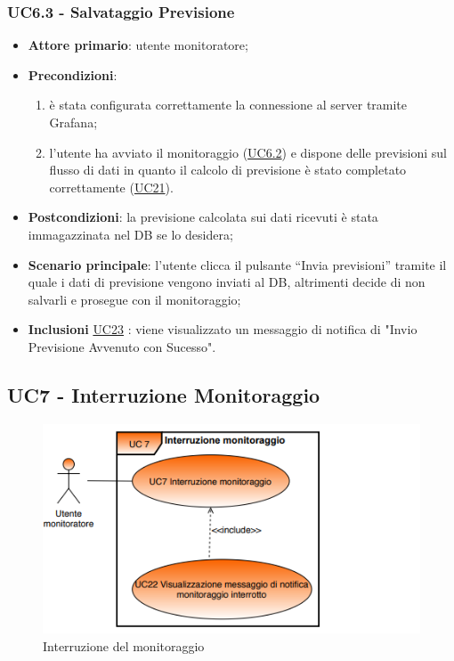 	\subsubsection{UC6.3 - Salvataggio Previsione}
		\begin{itemize}
			\item\textbf{Attore primario}: utente monitoratore;
			\item\textbf{Precondizioni}: 
				\begin{enumerate}
					\item è stata configurata correttamente la connessione al server tramite Grafana;
					\item l’utente ha avviato il monitoraggio (\hyperref[par:UC6.2]{UC6.2}) e dispone delle previsioni sul flusso di dati in quanto il calcolo di previsione è stato completato correttamente  (\hyperref[par:UC21]{UC21}).
				\end{enumerate}
			\item\textbf{Postcondizioni}: la previsione calcolata sui dati ricevuti è stata immagazzinata nel DB se lo desidera;
			\item\textbf{Scenario principale}: l’utente clicca il pulsante “Invia previsioni” tramite il quale i dati di previsione vengono inviati al DB, altrimenti decide di non salvarli e prosegue con il monitoraggio;
			\item\textbf{Inclusioni} \hyperref[par:UC23]{UC23} : viene visualizzato un messaggio di notifica di "Invio Previsione Avvenuto con Sucesso".
		\end{itemize}	


	\label{par:UC7}
	\subsection{UC7 - Interruzione Monitoraggio}

	\begin{figure}[H]
		\centering
		\includegraphics[scale=0.80]{../Analisi_dei_requisiti/img/Diagrammi_UML/UC7_Interruzione_monitoraggio.png}
		\caption{Interruzione del monitoraggio}
	\end{figure}

